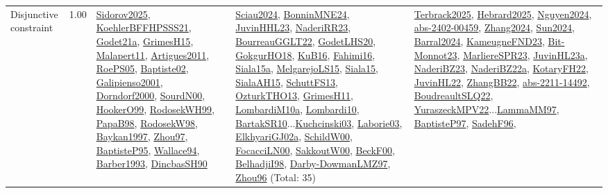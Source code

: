 {\begin{longtable}{p{3cm}r>{\raggedright\arraybackslash}p{6cm}>{\raggedright\arraybackslash}p{6cm}>{\raggedright\arraybackslash}p{8cm}}
\index{Disjunctive constraint}\index{Constraints!Disjunctive constraint}Disjunctive constraint &  1.00 & \hyperref[detail:Sidorov2025]{Sidorov2025}, \hyperref[detail:KoehlerBFFHPSSS21]{KoehlerBFFHPSSS21}, \hyperref[detail:Godet21a]{Godet21a}, \hyperref[detail:GrimesH15]{GrimesH15}, \hyperref[detail:Malapert11]{Malapert11}, \hyperref[detail:Artigues2011]{Artigues2011}, \hyperref[detail:RoePS05]{RoePS05}, \hyperref[detail:Baptiste02]{Baptiste02}, \hyperref[detail:Galipienso2001]{Galipienso2001}, \hyperref[detail:Dorndorf2000]{Dorndorf2000}, \hyperref[detail:SourdN00]{SourdN00}, \hyperref[detail:HookerO99]{HookerO99}, \hyperref[detail:RodosekWH99]{RodosekWH99}, \hyperref[detail:PapaB98]{PapaB98}, \hyperref[detail:RodosekW98]{RodosekW98}, \hyperref[detail:Baykan1997]{Baykan1997}, \hyperref[detail:Zhou97]{Zhou97}, \hyperref[detail:BaptisteP95]{BaptisteP95}, \hyperref[detail:Wallace94]{Wallace94}, \hyperref[detail:Barber1993]{Barber1993}, \hyperref[detail:DincbasSH90]{DincbasSH90} & \hyperref[detail:Sciau2024]{Sciau2024}, \hyperref[detail:BonninMNE24]{BonninMNE24}, \hyperref[detail:JuvinHHL23]{JuvinHHL23}, \hyperref[detail:NaderiRR23]{NaderiRR23}, \hyperref[detail:BourreauGGLT22]{BourreauGGLT22}, \hyperref[detail:GodetLHS20]{GodetLHS20}, \hyperref[detail:GokgurHO18]{GokgurHO18}, \hyperref[detail:KuB16]{KuB16}, \hyperref[detail:Fahimi16]{Fahimi16}, \hyperref[detail:Siala15a]{Siala15a}, \hyperref[detail:MelgarejoLS15]{MelgarejoLS15}, \hyperref[detail:Siala15]{Siala15}, \hyperref[detail:SialaAH15]{SialaAH15}, \hyperref[detail:SchuttFS13]{SchuttFS13}, \hyperref[detail:OzturkTHO13]{OzturkTHO13}, \hyperref[detail:GrimesH11]{GrimesH11}, \hyperref[detail:LombardiM10a]{LombardiM10a}, \hyperref[detail:Lombardi10]{Lombardi10}, \hyperref[detail:BartakSR10]{BartakSR10}...\hyperref[detail:Kuchcinski03]{Kuchcinski03}, \hyperref[detail:Laborie03]{Laborie03}, \hyperref[detail:ElkhyariGJ02a]{ElkhyariGJ02a}, \hyperref[detail:SchildW00]{SchildW00}, \hyperref[detail:FocacciLN00]{FocacciLN00}, \hyperref[detail:SakkoutW00]{SakkoutW00}, \hyperref[detail:BeckF00]{BeckF00}, \hyperref[detail:BelhadjiI98]{BelhadjiI98}, \hyperref[detail:Darby-DowmanLMZ97]{Darby-DowmanLMZ97}, \hyperref[detail:Zhou96]{Zhou96} (Total: 35) & \hyperref[detail:Terbrack2025]{Terbrack2025}, \hyperref[detail:Hebrard2025]{Hebrard2025}, \hyperref[detail:Nguyen2024]{Nguyen2024}, \hyperref[detail:abs-2402-00459]{abs-2402-00459}, \hyperref[detail:Zhang2024]{Zhang2024}, \hyperref[detail:Sun2024]{Sun2024}, \hyperref[detail:Barral2024]{Barral2024}, \hyperref[detail:KameugneFND23]{KameugneFND23}, \hyperref[detail:Bit-Monnot23]{Bit-Monnot23}, \hyperref[detail:MarliereSPR23]{MarliereSPR23}, \hyperref[detail:JuvinHL23a]{JuvinHL23a}, \hyperref[detail:NaderiBZ23]{NaderiBZ23}, \hyperref[detail:NaderiBZ22a]{NaderiBZ22a}, \hyperref[detail:KotaryFH22]{KotaryFH22}, \hyperref[detail:JuvinHL22]{JuvinHL22}, \hyperref[detail:ZhangBB22]{ZhangBB22}, \hyperref[detail:abs-2211-14492]{abs-2211-14492}, \hyperref[detail:BoudreaultSLQ22]{BoudreaultSLQ22}, \hyperref[detail:YuraszeckMPV22]{YuraszeckMPV22}...\hyperref[detail:LammaMM97]{LammaMM97}, \hyperref[detail:BaptisteP97]{BaptisteP97}, \hyperref[detail:SadehF96]{SadehF96}, 
\end{longtable}}
